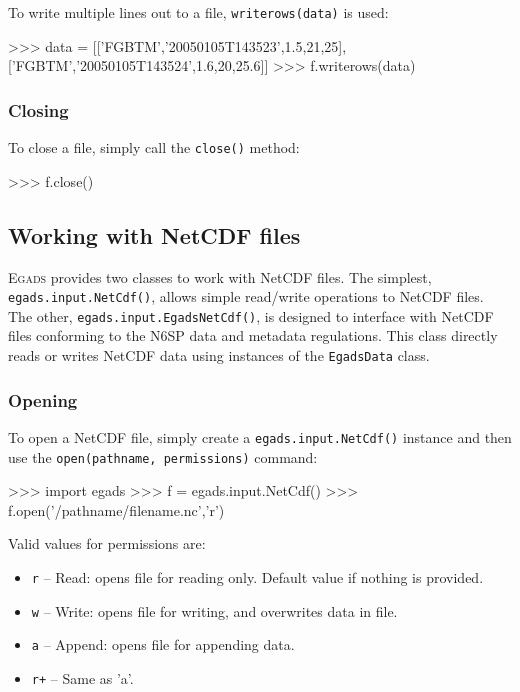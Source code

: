 \documentclass[a4paper,11pt]{report}
\newcommand{\Egads}{\textsc{Egads} }
\begin{document}
To write multiple lines out to a file, \verb|writerows(data)| is used:

\begin{command}
   >>> data = [['FGBTM','20050105T143523',1.5,21,25],['FGBTM','20050105T143524',1.6,20,25.6]]
   >>> f.writerows(data)
\end{command}


\subsubsection{Closing}

To close a file, simply call the \verb|close()| method:

\begin{command}
   >>> f.close()
\end{command}


\subsection{Working with NetCDF files}

\Egads provides two classes to work with NetCDF files. The simplest, \verb|egads.input.NetCdf()|, 
allows simple read/write operations to NetCDF files. The other, \verb|egads.input.EgadsNetCdf()|, 
is designed to interface with NetCDF files conforming to the N6SP data and metadata regulations. 
This class directly reads or writes NetCDF data using instances of the \verb|EgadsData| class.

\subsubsection{Opening}

To open a NetCDF file, simply create a \verb|egads.input.NetCdf()| instance and then use the \verb|open(pathname, permissions)| command:

\begin{command}
    >>> import egads
    >>> f = egads.input.NetCdf()
    >>> f.open('/pathname/filename.nc','r')
\end{command}
%
Valid values for permissions are:

\begin{itemize}
 \item \verb|r| -- Read: opens file for reading only. Default value if nothing is provided.
 \item \verb|w| -- Write: opens file for writing, and overwrites data in file.
 \item \verb|a| -- Append: opens file for appending data.
 \item \verb|r+| -- Same as 'a'.
\end{itemize}
\end{document}
